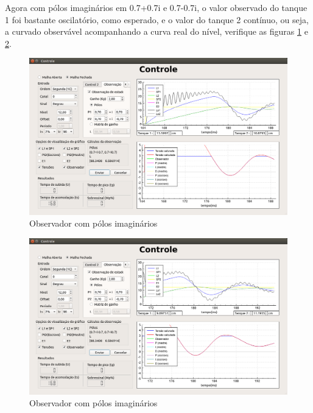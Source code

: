 \documentclass[a4paper,12pt]{article}
\begin{document}
\hspace{4ex}Agora com pólos imaginários em 0.7+0.7i e 0.7-0.7i, o valor observado do tanque 1 foi bastante oscilatório, como esperado, e o valor do tanque 2 contínuo, ou seja, a curvado observável acompanhando a curva real do nível, verifique as figuras \ref{img3} e \ref{img4}.
\begin{figure}[!h]
\centering
\includegraphics[width=13cm]{FotosObservador/PoloImaginario2}
\caption{Observador com pólos imaginários}
\label{img3}
\end{figure}
\begin{figure}[!h]
\centering
\includegraphics[width=13cm]{FotosObservador/PoloImaginario1}
\caption{Observador com pólos imaginários}
\label{img4}
\end{figure}
\end{document}
